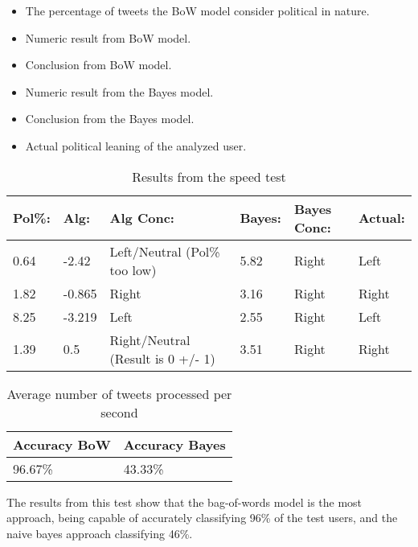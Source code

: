 \begin{itemize}
  \item The percentage of tweets the BoW model
consider political in nature.
\item Numeric result from BoW model.
\item Conclusion from BoW model.
\item Numeric result from the Bayes model.
\item Conclusion from the Bayes model.
\item Actual political leaning of the analyzed user.
\end{itemize}

\begin{table}[H]\centering
\begin{tabular}{|l|l|l|l|l|l|}
\hline
\textbf{Pol\%:}	&	\textbf{Alg:}	&	\textbf{Alg Conc:}							&	\textbf{Bayes:}	&
\textbf{Bayes Conc:}
& \textbf{Actual:}
\\\hline 0.64	&	-2.42	&	Left/Neutral (Pol\% too low)		&	5.82	&	Right		&	Left	\\\hline
1.82	&	-0.865	&	Right								&	3.16	&	Right		&	Right	\\\hline
8.25	&	-3.219	&	Left								&	2.55	&	Right		&	Left	\\\hline
1.39	&	0.5		&	Right/Neutral (Result is 0 +/- 1)	&	3.51	&	Right		&	Right	\\\hline
\end{tabular}
\caption{Results from the speed test}
\label{speedTestReslabel}
\end{table}

\begin{table}[H]\centering
\begin{tabular}{|l|l|}\hline
\textbf{Accuracy BoW}	&	\textbf{Accuracy Bayes}	\\\hline
96.67\%					&	43.33\%					\\\hline	
\end{tabular}
\caption{Average number of tweets processed per second}
\label{AccPercent}
\end{table}

The results from this test show that the bag-of-words model is the most
approach, being capable of accurately classifying 96\% of the test users, and
the naive bayes approach classifying 46\%.













